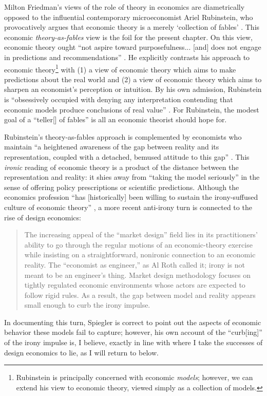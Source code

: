 Milton Friedman's views of the role of theory in economics are diametrically opposed to the influential contemporary microeconomist Ariel Rubinstein, who provocatively argues that economic theory is a merely `collection of fables' \autocite{rubinstein2006,rubinstein2012}. This economic \textit{theory-as-fables} view is the foil for the present chapter. On this view, economic theory ought ``not aspire toward purposefulness... [and] does not engage in predictions and recommendations'' \autocite[35-6]{rubinstein2012}. He explicitly contrasts his approach to economic theory\footnote{Rubinstein is principally concerned with economic \textit{models}; however, we can extend his view to economic theory, viewed simply as a collection of models.} with (1) a view of economic theory which aims to make predictions about the real world and (2) a view of economic theory which aims to sharpen an economist’s perception or intuition. By his own admission, Rubinstein is ``obsessively occupied with denying any interpretation contending that economic models produce conclusions of real value'' \autocite[37]{rubinstein2012}. For Rubinstein, the modest goal of a ``teller[] of fables'' \autocite[882]{rubinstein2006} is all an economic theorist should hope for.

Rubinstein's theory-as-fables approach is complemented by economists who maintain ``a heightened awareness of the gap between reality and its representation, coupled with a detached, bemused attitude to this gap'' \autocite[175]{spiegler2024}. This \textit{ironic} reading of economic theory is a product of the distance between the representation and reality: it shies away from ``taking the model seriously'' \autocite[176]{spiegler2024} in the sense of offering policy prescriptions or scientific predictions. Although the economics profession ``has [historically] been willing to sustain the irony-suffused culture of economic theory'' \autocite[176]{spiegler2024}, a more recent anti-irony turn is connected to the rise of design economics:
\begin{quote}
    The increasing appeal of the ``market design'' field lies in its practitioners’ ability to go through the regular motions of an economic-theory exercise while insisting on a straightforward, nonironic connection to an economic reality. The ``economist as engineer,'' as Al Roth \autocite*{roth2002} called it; irony is not meant to be an engineer’s thing. Market design methodology focuses on tightly regulated economic environments whose actors are expected to follow rigid rules. As a result, the gap between model and reality appears small enough to curb the irony impulse. \autocite[177-8]{spiegler2024}
\end{quote}
\noindent In documenting this turn, Spiegler \autocite*{spiegler2024} is correct to point out the aspects of economic behavior these models fail to capture; however, his own account of the ``curb[ing]'' of the irony impulse is, I believe, exactly in line with where I take the successes of design economics to lie, as I will return to below.

